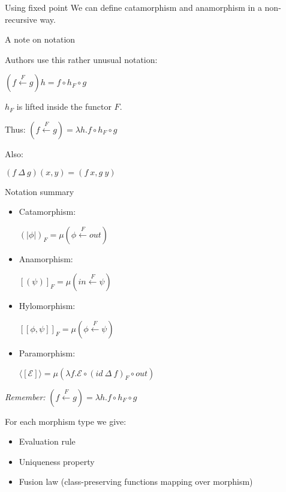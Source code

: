 \documentclass{beamer}
\newcommand{\hin}[2]{}
\begin{document}
\begin{frame}{Using fixed point}
We can define catamorphism and anamorphism in a non-recursive way.

\hin{168}{175}

\end{frame}


\begin{frame}{A note on notation}

Authors use this rather unusual notation:


$(f \xleftarrow{F} g) h = f \circ h_F \circ g$ 

$h_F$ is lifted inside the functor $F$.

Thus: $(f \xleftarrow{F} g)  = \lambda h. f \circ h_F \circ g$ 

Also:

$(f\ \Delta\  g) (x,y) = (f\  x, g \ y)$
\end{frame}


\begin{frame}{Notation summary}

 
 
\begin{itemize}
\item Catamorphism:

$(\!|\phi|\!)_F = \mu(\phi \xleftarrow{F} out)$ 

\hin{171}{171}

\item Anamorphism:

$[\!(\psi)\!]_F = \mu(in \xleftarrow{F} \psi )$ 

\hin{174}{174}

\item Hylomorphism:

$[\![\phi, \psi]\!]_F = \mu(\phi \xleftarrow{F} \psi )$ 

\item Paramorphism:

$\langle\![ \mathcal{E} ]\!\rangle = \mu ( \lambda f. \mathcal{E} \circ (id\ \Delta\ f)_F \circ out) $
\end{itemize}

\textit{Remember:} $(f \xleftarrow{F} g)  = \lambda h. f \circ h_F \circ g$ 


\end{frame}

\begin{frame}
For each morphism type we give:
\begin{itemize}
\item Evaluation rule
\item Uniqueness property
\item Fusion law (class-preserving functions mapping over morphism)
\end{itemize}
\end{frame}
\end{document}
